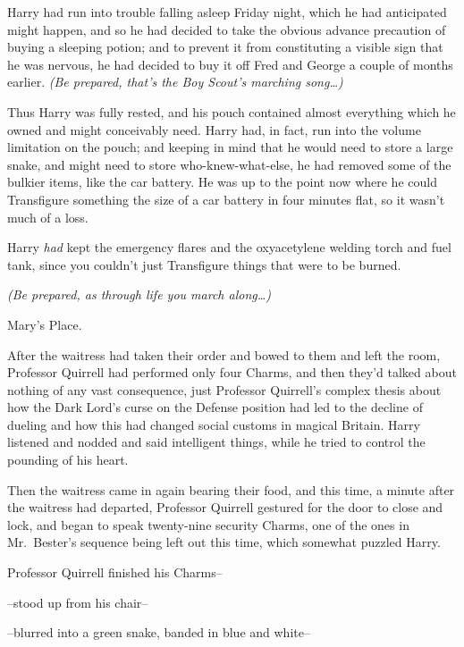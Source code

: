 

\hplettrineextrapara
Harry had run into trouble falling asleep Friday night, which he had anticipated might happen, and so he had decided to take the obvious advance precaution of buying a sleeping potion; and to prevent it from constituting a visible sign that he was nervous, he had decided to buy it off Fred and George a couple of months earlier. \emph{(Be prepared, that's the Boy Scout's marching song{\ldots})}

Thus Harry was fully rested, and his pouch contained almost everything which he owned and might conceivably need. Harry had, in fact, run into the volume limitation on the pouch; and keeping in mind that he would need to store a large snake, and might need to store who-knew-what-else, he had removed some of the bulkier items, like the car battery. He was up to the point now where he could Transfigure something the size of a car battery in four minutes flat, so it wasn't much of a loss.

Harry \emph{had} kept the emergency flares and the oxyacetylene welding torch and fuel tank, since you couldn't just Transfigure things that were to be burned.

\emph{(Be prepared, as through life you march along{\ldots})}

Mary's Place.

After the waitress had taken their order and bowed to them and left the room, Professor Quirrell had performed only four Charms, and then they'd talked about nothing of any vast consequence, just Professor Quirrell's complex thesis about how the Dark Lord's curse on the Defense position had led to the decline of dueling and how this had changed social customs in magical Britain. Harry listened and nodded and said intelligent things, while he tried to control the pounding of his heart.

Then the waitress came in again bearing their food, and this time, a minute after the waitress had departed, Professor Quirrell gestured for the door to close and lock, and began to speak twenty-nine security Charms, one of the ones in Mr.~Bester's sequence being left out this time, which somewhat puzzled Harry.

Professor Quirrell finished his Charms\---

\---stood up from his chair\---

\---blurred into a green snake, banded in blue and white\---

